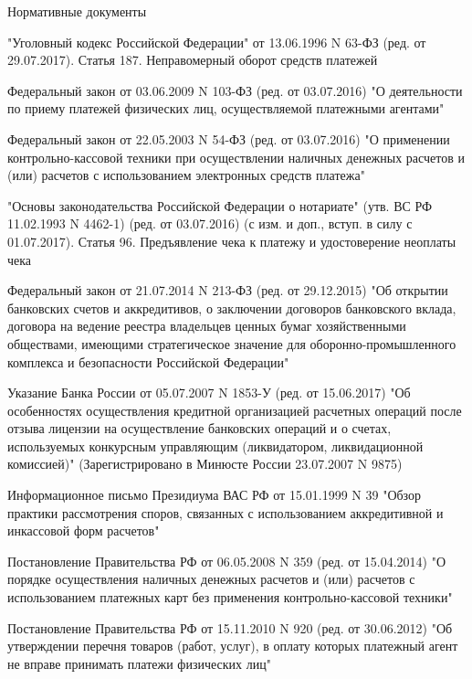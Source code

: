 \documentclass[_Banking_p3.tex]{subfiles}
\begin{document}
\begin{frame}[allowframebreaks]{Нормативные документы}
\begin{thebibliography}{10}
\pagebreak
"Уголовный кодекс Российской Федерации" от 13.06.1996 N 63-ФЗ (ред. от 29.07.2017). Статья 187. Неправомерный оборот средств платежей

Федеральный закон от 03.06.2009 N 103-ФЗ (ред. от 03.07.2016) "О деятельности по приему платежей физических лиц, осуществляемой платежными агентами"

\pagebreak

Федеральный закон от 22.05.2003 N 54-ФЗ (ред. от 03.07.2016) "О применении контрольно-кассовой техники при осуществлении наличных денежных расчетов и (или) расчетов с использованием электронных средств платежа"


"Основы законодательства Российской Федерации о нотариате" (утв. ВС РФ 11.02.1993 N 4462-1) (ред. от 03.07.2016) (с изм. и доп., вступ. в силу с 01.07.2017). Статья 96. Предъявление чека к платежу и удостоверение неоплаты чека


\pagebreak

Федеральный закон от 21.07.2014 N 213-ФЗ (ред. от 29.12.2015) "Об открытии банковских счетов и аккредитивов, о заключении договоров банковского вклада, договора на ведение реестра владельцев ценных бумаг хозяйственными обществами, имеющими стратегическое значение для оборонно-промышленного комплекса и безопасности Российской Федерации"

\pagebreak

Указание Банка России от 05.07.2007 N 1853-У (ред. от 15.06.2017) "Об особенностях осуществления кредитной организацией расчетных операций после отзыва лицензии на осуществление банковских операций и о счетах, используемых конкурсным управляющим (ликвидатором, ликвидационной комиссией)" (Зарегистрировано в Минюсте России 23.07.2007 N 9875)

Информационное письмо Президиума ВАС РФ от 15.01.1999 N 39 "Обзор практики рассмотрения споров, связанных с использованием аккредитивной и инкассовой форм расчетов"

\pagebreak

Постановление Правительства РФ от 06.05.2008 N 359 (ред. от 15.04.2014) "О порядке осуществления наличных денежных расчетов и (или) расчетов с использованием платежных карт без применения контрольно-кассовой техники"


Постановление Правительства РФ от 15.11.2010 N 920 (ред. от 30.06.2012) "Об утверждении перечня товаров (работ, услуг), в оплату которых платежный агент не вправе принимать платежи физических лиц"

  \end{thebibliography}
\end{frame}
\end{document}
